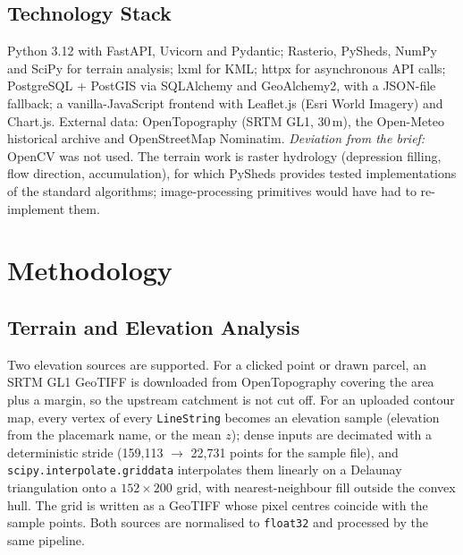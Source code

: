 \documentclass[manuscript,screen,review]{acmart}
\begin{document}
\subsection{Technology Stack}
Python 3.12 with FastAPI, Uvicorn and Pydantic; Rasterio, PySheds, NumPy and SciPy for terrain analysis; lxml for KML; httpx for asynchronous API calls; PostgreSQL + PostGIS via SQLAlchemy and GeoAlchemy2, with a JSON-file fallback; a vanilla-JavaScript frontend with Leaflet.js (Esri World Imagery) and Chart.js. External data: OpenTopography (SRTM GL1, 30\,m), the Open-Meteo historical archive and OpenStreetMap Nominatim. \emph{Deviation from the brief:} OpenCV was not used. The terrain work is raster hydrology (depression filling, flow direction, accumulation), for which PySheds provides tested implementations of the standard algorithms; image-processing primitives would have had to re-implement them.

\section{Methodology}
\label{sec:methodology}

\subsection{Terrain and Elevation Analysis}
Two elevation sources are supported. For a clicked point or drawn parcel, an SRTM GL1 GeoTIFF is downloaded from OpenTopography covering the area plus a margin, so the upstream catchment is not cut off. For an uploaded contour map, every vertex of every \texttt{LineString} becomes an elevation sample (elevation from the placemark name, or the mean $z$); dense inputs are decimated with a deterministic stride (159,113 $\to$ 22,731 points for the sample file), and \texttt{scipy.interpolate.griddata} interpolates them linearly on a Delaunay triangulation onto a $152\times200$ grid, with nearest-neighbour fill outside the convex hull. The grid is written as a GeoTIFF whose pixel centres coincide with the sample points. Both sources are normalised to \texttt{float32} and processed by the same pipeline.
\end{document}
